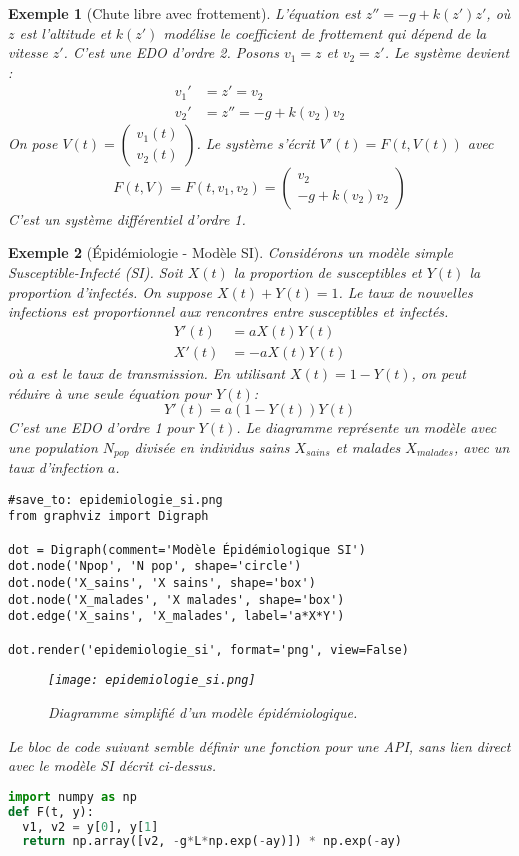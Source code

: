 \documentclass{article}
\newtheorem{example}{Exemple}
\begin{document}
\begin{example}[Chute libre avec frottement]
L'équation est $z'' = -g + k(z') z'$, où $z$ est l'altitude et $k(z')$ modélise le coefficient de frottement qui dépend de la vitesse $z'$. C'est une EDO d'ordre 2.
Posons $v_1 = z$ et $v_2 = z'$.
Le système devient :
\begin{align*} v_1' &= z' = v_2 \\ v_2' &= z'' = -g + k(v_2) v_2 \end{align*}
On pose $V(t) = \begin{pmatrix} v_1(t) \\ v_2(t) \end{pmatrix}$.
Le système s'écrit $V'(t) = F(t, V(t))$ avec
\[ F(t, V) = F(t, v_1, v_2) = \begin{pmatrix} v_2 \\ -g + k(v_2) v_2 \end{pmatrix} \]
C'est un système différentiel d'ordre 1.
\end{example}

\begin{example}[Épidémiologie - Modèle SI]
Considérons un modèle simple Susceptible-Infecté (SI). Soit $X(t)$ la proportion de susceptibles et $Y(t)$ la proportion d'infectés. On suppose $X(t) + Y(t) = 1$.
Le taux de nouvelles infections est proportionnel aux rencontres entre susceptibles et infectés.
\begin{align*} Y'(t) &= a X(t) Y(t) \\ X'(t) &= -a X(t) Y(t) \end{align*}
où $a$ est le taux de transmission.
En utilisant $X(t) = 1 - Y(t)$, on peut réduire à une seule équation pour $Y(t)$:
\[ Y'(t) = a (1 - Y(t)) Y(t) \]
C'est une EDO d'ordre 1 pour $Y(t)$.
Le diagramme représente un modèle avec une population $N_{pop}$ divisée en individus sains $X_{sains}$ et malades $X_{malades}$, avec un taux d'infection $a$.
\begin{verbatim}
#save_to: epidemiologie_si.png
from graphviz import Digraph

dot = Digraph(comment='Modèle Épidémiologique SI')
dot.node('Npop', 'N pop', shape='circle')
dot.node('X_sains', 'X sains', shape='box')
dot.node('X_malades', 'X malades', shape='box')
dot.edge('X_sains', 'X_malades', label='a*X*Y')

dot.render('epidemiologie_si', format='png', view=False)
\end{verbatim}
\begin{figure}[H]
\centering
\texttt{[image: epidemiologie\_si.png]}
\caption{Diagramme simplifié d'un modèle épidémiologique.}
\label{fig:epidemiologie}
\end{figure}
Le bloc de code suivant semble définir une fonction pour une API, sans lien direct avec le modèle SI décrit ci-dessus.
\begin{lstlisting}[language=Python, breaklines=true]
import numpy as np
def F(t, y):
  v1, v2 = y[0], y[1]
  return np.array([v2, -g*L*np.exp(-ay)]) * np.exp(-ay)
\end{lstlisting}
\end{example}
\end{document}

